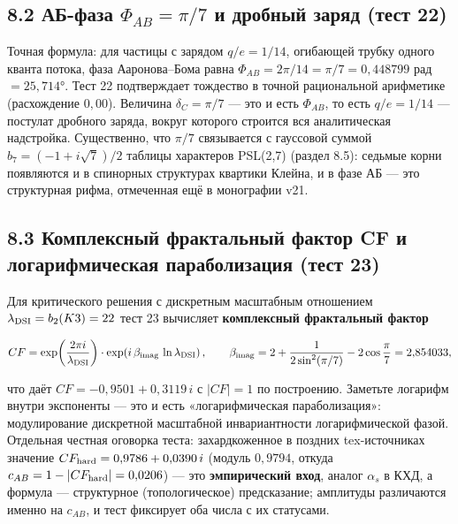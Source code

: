 \documentclass[
]{article}
\begin{document}
\subsection{\texorpdfstring{8.2 АБ-фаза \(\Phi_{AB} = \pi/7\) и дробный
заряд (тест
22)}{8.2 АБ-фаза \textbackslash Phi\_\{AB\} = \textbackslash pi/7 и дробный заряд (тест 22)}}\label{ux430ux431-ux444ux430ux437ux430-phi_ab-pi7-ux438-ux434ux440ux43eux431ux43dux44bux439-ux437ux430ux440ux44fux434-ux442ux435ux441ux442-22}

Точная формула: для частицы с зарядом \(q/e = 1/14\), огибающей трубку
одного кванта потока, фаза Ааронова--Бома равна
\(\Phi_{AB} = 2\pi/14 = \pi/7 = 0{,}448799\) рад \(= 25{,}714°\). Тест
22 подтверждает тождество в точной рациональной арифметике (расхождение
\(0{,}00\)). Величина \(\delta_C=\pi/7\) --- это и есть \(\Phi_{AB}\),
то есть \(q/e=1/14\) --- постулат дробного заряда, вокруг которого
строится вся аналитическая надстройка. Существенно, что \(\pi/7\)
связывается с гауссовой суммой \(b_7=(-1+i\sqrt7)/2\) таблицы характеров
PSL(2,7) (раздел 8.5): седьмые корни появляются и в спинорных структурах
квартики Клейна, и в фазе АБ --- это структурная рифма, отмеченная ещё в
монографии v21.

\subsection{8.3 Комплексный фрактальный фактор CF и логарифмическая
параболизация (тест
23)}\label{ux43aux43eux43cux43fux43bux435ux43aux441ux43dux44bux439-ux444ux440ux430ux43aux442ux430ux43bux44cux43dux44bux439-ux444ux430ux43aux442ux43eux440-cf-ux438-ux43bux43eux433ux430ux440ux438ux444ux43cux438ux447ux435ux441ux43aux430ux44f-ux43fux430ux440ux430ux431ux43eux43bux438ux437ux430ux446ux438ux44f-ux442ux435ux441ux442-23}

Для критического решения с дискретным масштабным отношением
\(\lambda_{\rm DSI} = b_2(K3) = 22\) тест 23 вычисляет
\textbf{комплексный фрактальный фактор}

\[CF = \exp\!\left(\frac{2\pi i}{\lambda_{\rm DSI}}\right)\cdot\exp\!\left(i\,\beta_{\rm imag}\,\ln\lambda_{\rm DSI}\right),\qquad \beta_{\rm imag} = 2 + \frac{1}{2\sin^2(\pi/7)} - 2\cos\frac{\pi}{7} = 2{,}854033,\]

что даёт \(CF = -0{,}9501 + 0{,}3119\,i\) с \(|CF| = 1\) по построению.
Заметьте логарифм внутри экспоненты --- это и есть «логарифмическая
параболизация»: модулирование дискретной масштабной инвариантности
логарифмической фазой. Отдельная честная оговорка теста: захардкоженное
в поздних tex-источниках значение
\(CF_{\rm hard} = 0{,}9786 + 0{,}0390\,i\) (модуль \(0{,}9794\), откуда
\(c_{AB} = 1-|CF_{\rm hard}| = 0{,}0206\)) --- это \textbf{эмпирический
вход}, аналог \(\alpha_s\) в КХД, а формула --- структурное
(топологическое) предсказание; амплитуды различаются именно на
\(c_{AB}\), и тест фиксирует оба числа с их статусами.
\end{document}
